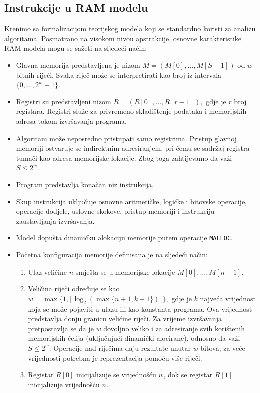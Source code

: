 \subsection{Instrukcije u RAM modelu}

Krenimo sa formalizacijom teorijskog modela koji se standardno koristi za analizu algoritama. Posmatrano na visokom nivou apstrakcije, osnovne karakteristike RAM modela mogu se sažeti na sljedeći način:

\begin{itemize}
	\item Glavna memorija predstavljena je nizom
	$
	M=(M[0],\ldots,M[S-1])
	$ 	od $w$-bitnih riječi. Svaka riječ može se interpretirati kao broj iz intervala 
		$\{0,\ldots,2^w-1\}.$ 

	\item Registri su predstavljeni nizom $
	R=(R[0],\ldots,R[r-1]), $ 	gdje je $r$ broj registara. Registri služe za privremeno skladištenje podataka i memorijskih adresa tokom izvršavanja programa.
	
	\item Algoritam može neposredno pristupati samo registrima. Pristup glavnoj memoriji ostvaruje se indirektnim adresiranjem, pri čemu se sadržaj registra tumači kao adresa memorijske lokacije. Zbog toga zahtijevamo da važi
	$
	S \leq 2^w.
	$
	
	\item Program predstavlja konačan niz instrukcija.
	
	\item Skup instrukcija uključuje osnovne aritmetičke, logičke i bitovske operacije, operacije dodjele, uslovne skokove, pristup memoriji i instrukciju zaustavljanja izvršavanja.
	
	\item Model dopušta dinamičku alokaciju memorije putem operacije \texttt{MALLOC}.
	
	\item Početna konfiguracija memorije definisana je na sljedeći način:
	\begin{enumerate}
		\item Ulaz veličine $n$ smješta se u memorijske lokacije
		$
		M[0],\ldots,M[n-1].
		$
		
		\item Veličina riječi određuje se kao
		$
		w=\max\{1,\lceil \log_2(\max\{n+1,k+1\}) \rceil\},
		$
		gdje je $k$ najveća vrijednost koja se može pojaviti u ulazu ili kao konstanta programa. Ova vrijednost predstavlja donju granicu veličine riječi. Za vrijeme izvršavanja pretpostavlja se da je $w$ dovoljno veliko i za adresiranje svih korištenih memorijskih ćelija (uključujući dinamički alocirane), odnosno da važi $S\leq 2^w$. Operacije nad riječima daju rezultate unutar $w$ bitova; za veće vrijednosti potrebna je reprezentacija pomoću više riječi.
		
		\item Registar $R[0]$ inicijalizuje se vrijednošću $w$, dok se registar $R[1]$ inicijalizuje vrijednošću $n$.
	\end{enumerate}
	
	
\end{itemize}

